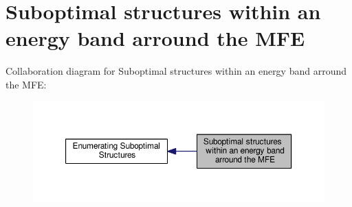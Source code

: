 \hypertarget{group__subopt__wuchty}{\section{Suboptimal structures within an energy band arround the M\+F\+E}
\label{group__subopt__wuchty}
}
Collaboration diagram for Suboptimal structures within an energy band arround the M\+F\+E\+:
\nopagebreak
\begin{figure}[H]
\begin{center}
\leavevmode
\includegraphics[width=350pt]{group__subopt__wuchty}
\end{center}
\end{figure}
